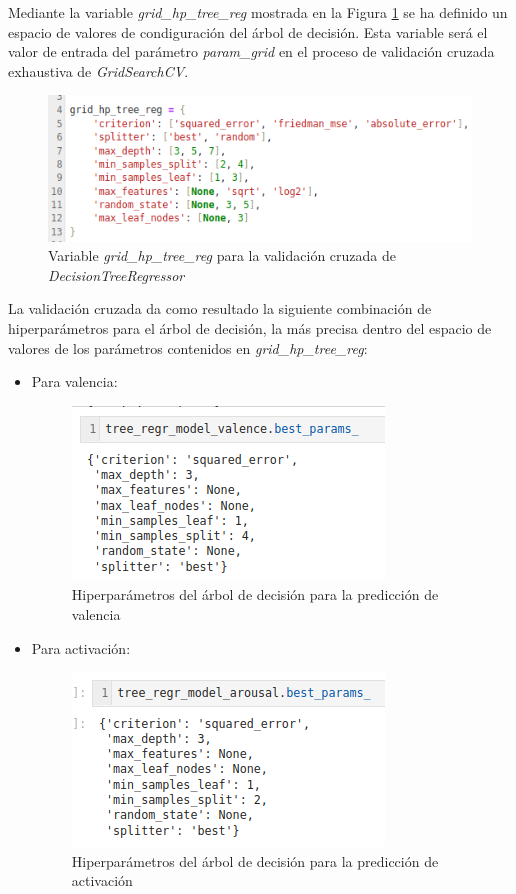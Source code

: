 \documentclass[12pt,a4paper]{article}
\begin{document}
Mediante la variable \textit{grid\_hp\_tree\_reg} mostrada en la Figura \ref{fig:paramstree} se ha definido un espacio de valores de condiguración del árbol de decisión. Esta variable será el valor de entrada del parámetro \textit{param\_grid} en el proceso de validación cruzada exhaustiva de \textit{GridSearchCV}.
\begin{figure}[H]
	\centering
	\includegraphics[width=0.7\linewidth]{figs/params_tree}
	\caption{Variable \textit{grid\_hp\_tree\_reg} para la validación cruzada de \textit{DecisionTreeRegressor}}
	\label{fig:paramstree}
\end{figure}

La validación cruzada da como resultado la siguiente combinación de hiperparámetros para el árbol de decisión, la más precisa dentro del espacio de valores de los parámetros contenidos en \textit{grid\_hp\_tree\_reg}:
\begin{itemize}
	\item Para valencia:
	\begin{figure}[H]
		\centering
		\includegraphics[width=0.5\linewidth]{figs/final_params_tree}
		\caption{Hiperparámetros del árbol de decisión para la predicción de valencia}
		\label{fig:finalparamstree}
	\end{figure}
	\item Para activación:
	\begin{figure}[H]
		\centering
		\includegraphics[width=0.5\linewidth]{figs/final_params_tree_arousal}
		\caption{Hiperparámetros del árbol de decisión para la predicción de activación}
		\label{fig:finalparamstreearousal}
	\end{figure}
\end{itemize}
\end{document}
